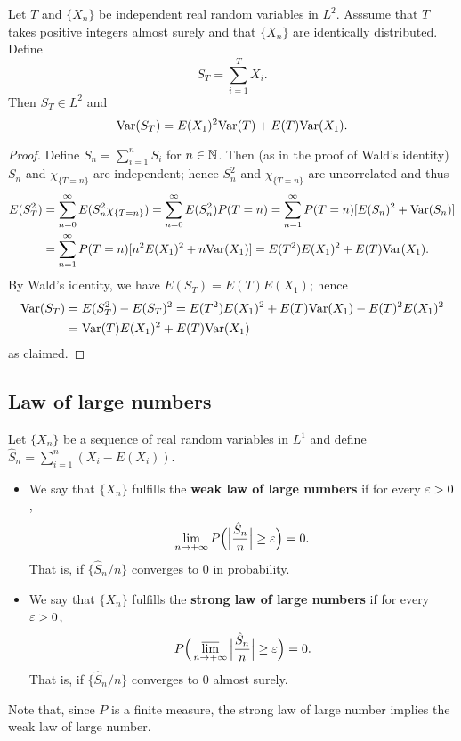 \begin{theorem}
Let $T$ and $\{X_n\}$ be independent real random variables in $L^2$. Asssume that $T$ takes positive integers almost surely and that $\{X_n\}$ are identically distributed. Define
\[S_T=\sum_{i=1}^{T}X_i.\]
Then $S_T\in L^2$ and
\[\mathrm{Var}(S_T)=E(X_1)^2\mathrm{Var}(T)+E(T)\mathrm{Var}(X_1).\]
\end{theorem}
\begin{proof}
Define $S_n=\sum_{i=1}^{n}S_i$ for $n\in\mathbb{N}$. Then (as in the proof of Wald's identity) $S_n$ and $\chi_{\{T=n\}}$ are independent; hence $S_n^2$ and $\chi_{\{T=n\}}$ are uncorrelated and thus
\begin{align*}
E(S_T^2)&=\sum_{n=0}^{\infty}E(S_n^2\chi_{\{T=n\}})=\sum_{n=0}^{\infty}E(S_n^2)P(T=n)=\sum_{n=1}^{\infty}P(T=n)[E(S_n)^2+\mathrm{Var}(S_n)]\\
&=\sum_{n=1}^{\infty}P(T=n)[n^2E(X_1)^2+n\mathrm{Var}(X_1)]=E(T^2)E(X_1)^2+E(T)\mathrm{Var}(X_1).
\end{align*}
By Wald's identity, we have $E(S_T)=E(T)E(X_1)$; hence
\begin{align*}
\mathrm{Var}(S_T)&=E(S_T^2)-E(S_T)^2=E(T^2)E(X_1)^2+E(T)\mathrm{Var}(X_1)-E(T)^2E(X_1)^2\\
&=\mathrm{Var}(T)E(X_1)^2+E(T)\mathrm{Var}(X_1)
\end{align*}
as claimed.
\end{proof}
\subsection{Law of large numbers}
\begin{definition}
Let $\{X_n\}$ be a sequence of real random variables in $L^1$ and define $\hat{S}_n=\sum_{i=1}^{n}(X_i-E(X_i))$.
\begin{itemize}
\item We say that $\{X_n\}$ fulfills the \textbf{weak law of large numbers} if for every $\varepsilon>0$,
\[\lim_{n\to+\infty}P\Big(\Big|\frac{\hat{S}_n}{n}\Big|\geq\varepsilon\Big)=0.\]
That is, if $\{\hat{S}_n/n\}$ converges to $0$ in probability.
\item We say that $\{X_n\}$ fulfills the \textbf{strong law of large numbers} if for every $\varepsilon>0$,
\[P\Big(\varlimsup_{n\to+\infty}\Big|\frac{\hat{S}_n}{n}\Big|\geq\varepsilon\Big)=0.\]
That is, if $\{\hat{S}_n/n\}$ converges to $0$ almost surely.
\end{itemize}
\end{definition}
Note that, since $P$ is a finite measure, the strong law of large number implies the weak law of large number.
